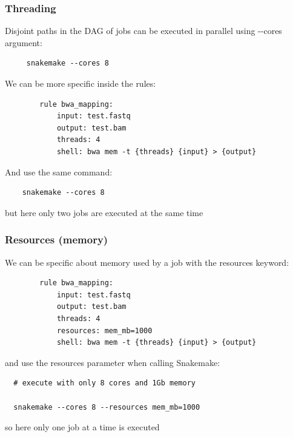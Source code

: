 \documentclass{beamer}
\begin{document}



\begin{frame}[fragile]
\frametitle{Threading}
Disjoint paths in the DAG of jobs can be executed in parallel using -\--cores 
argument:
\begin{lstlisting}
     snakemake --cores 8
\end{lstlisting}
We can be more specific inside the rules:
\begin{lstlisting}
        rule bwa_mapping:
            input: test.fastq
            output: test.bam
            threads: 4 
            shell: bwa mem -t {threads} {input} > {output}
\end{lstlisting}
 And use the same command:
 \begin{lstlisting}
    snakemake --cores 8
 \end{lstlisting}
 but here only two jobs are executed at the same time
\end{frame}
 
 
\begin{frame}[fragile]
\frametitle{Resources (memory)}
We can be specific about memory used by a job with the resources keyword:
\begin{lstlisting}
        rule bwa_mapping:
            input: test.fastq
            output: test.bam
            threads: 4 
            resources: mem_mb=1000
            shell: bwa mem -t {threads} {input} > {output}
 \end{lstlisting}
  
and use the resources parameter when calling Snakemake:  
  \begin{lstlisting}
  # execute with only 8 cores and 1Gb memory
  
  snakemake --cores 8 --resources mem_mb=1000
  \end{lstlisting}   
  
  so here only one job at a time is executed
  
\end{frame}
 
\end{document}
